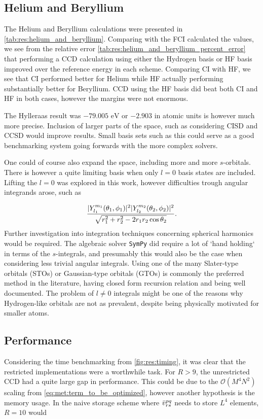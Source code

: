 \subsection{Helium and Beryllium}
The Helium and Beryllium calculations were presented in \cref{tab:res:helium_and_beryllium}. Comparing with the FCI calculated the values, we see from the relative error \cref{tab:res:helium_and_beryllium_percent_error} that performing a CCD calculation using either the Hydrogen basis or HF basis improved over the reference energy in each scheme. Comparing CI with HF, we see that CI performed better for Helium while HF actually performing substantially better for Beryllium. CCD using the HF basis did beat both CI and HF in both cases, however the margins were not enormous.

The Hylleraas result \citep{hylleraasNumerischeBerechnung2STerme1930} was $-79.005 \text{ eV}$ or $-2.903$ in atomic units is however much more precise. Inclusion of larger parts of the space, such as considering CISD and CCSD would improve results. Small basis sets such as this could serve as a good benchmarking system going forwards with the more complex solvers.

One could of course also expand the space, including more and more $s$-orbitals. There is however a quite limiting basis when only $l=0$ basis states are included. Lifting the $l = 0$ was explored in this work, however difficulties trough  angular integrands arose, such as

\begin{align*}
    \frac{|Y^{m_1}_{l_1}(\theta_1,\phi_1)|^2|Y^{m_2}_{l_2}(\theta_2,\phi_2)|^2}{\sqrt{r_1^2 + r_2 ^2 - 2r_1 r_2 \cos \theta_2 }}.
\end{align*}
Further investigation into integration techniques concerning spherical harmonics would be required. The algebraic solver \verb|SymPy| did require a lot of `hand holding` in terms of the $s$-integrals, and presumably this would also be the case when considering less trivial angular integrals. Using one of the many Slater-type orbitals (STOs) or Gaussian-type orbitals (GTOs) is commonly the preferred method in the literature, having closed form recursion relation and being well documented. The problem of $l \neq 0$ integrals might be one of the reasons why Hydrogen-like orbitals are not as prevalent, despite being physically motivated for smaller atoms.  

\subsection{Performance}
Considering the time benchmarking from \cref{fig:res:timing}, it was clear that the restricted implementations were a worthwhile task. For $R > 9$, the unrestricted CCD had a quite large gap in performance. This could be due to the $\mathcal{O}(M^4 N^2)$ scaling from \cref{eq:met:term_to_be_optimized}, however another hypothesis is the memory usage. In the naive storage scheme where $\bar{v}^{pq}_{rs}$ needs to store $L^4$ elements, $R = 10$ would 


